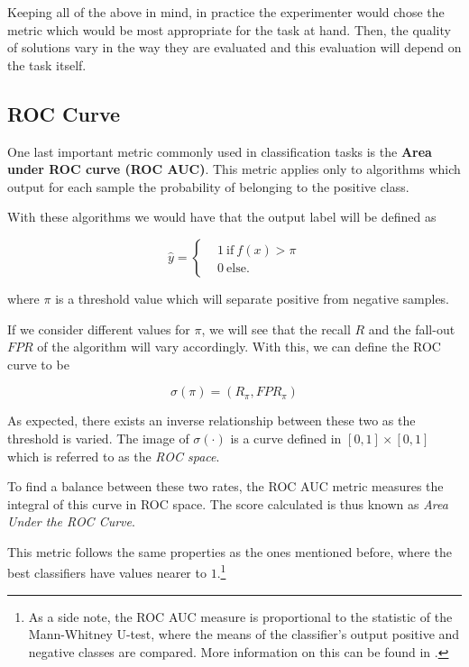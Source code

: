 Keeping all of the above in mind, in practice the experimenter would chose the metric which would be most appropriate for the task at hand.
Then, the quality of solutions vary in the way they are evaluated and this evaluation will depend on the task itself.


\subsection{ROC Curve}\label{sub:roc_curve}

One last important metric commonly used in classification tasks is the \textbf{Area under ROC curve (ROC AUC)}.
This metric applies only to algorithms which output for each sample the probability of belonging to the positive class.

With these algorithms we would have that the output label will be defined as

\begin{equation}
\hat{y} =
\begin{cases}
&1 \ \mbox{if} \ f(x) > \pi \\
&0 \ \mbox{else}.
\end{cases}
\end{equation}

where $\pi$ is a threshold value which will separate positive from negative samples.


If we consider different values for $\pi$, we will see that the recall $R$ and the fall-out $FPR$ of the algorithm will vary accordingly.
With this, we can define the ROC curve to be

\begin{equation}
\sigma(\pi) = (R_\pi, FPR_\pi)
\end{equation}

As expected, there exists an inverse relationship between these two as the threshold is varied.
The image of $\sigma(\cdot)$ is a curve defined in $[0,1]\times[0,1]$ which is referred to as the \textit{ROC space}.

To find a balance between these two rates, the ROC AUC metric measures the integral of this curve in ROC space.
The score calculated is thus known as \textit{Area Under the ROC Curve}.

This metric follows the same properties as the ones mentioned before, where the best classifiers have values nearer to $1$.\footnote{As a side note, the ROC AUC measure is proportional to the statistic of the Mann-Whitney U-test, where the means of the classifier's output positive and negative classes are compared.
More information on this can be found in \textcite{mason-rocAucRelationship}.}

